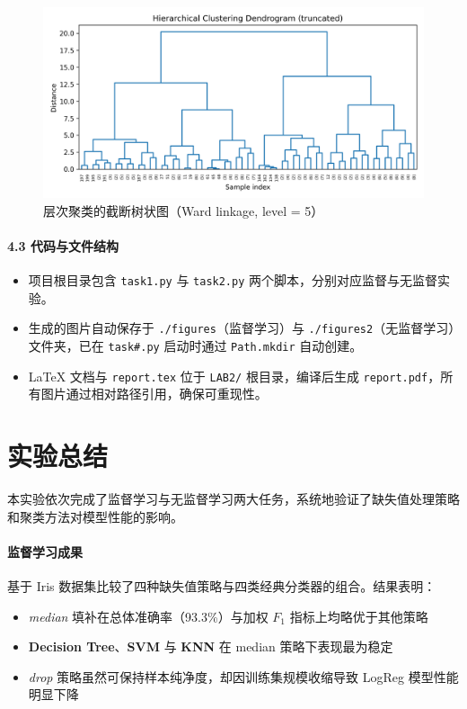 \documentclass[UTF8]{ctexart}
\begin{document}
\begin{figure}[htbp]
    \centering
    \includegraphics[width=\linewidth]{figures2/dendrogram.png}
    \caption{层次聚类的截断树状图（Ward linkage, level = 5）}
    \label{fig:dendro}
\end{figure}

\paragraph{4.3 代码与文件结构}
\begin{itemize}
    \item 项目根目录包含 \texttt{task1.py} 与 \texttt{task2.py} 两个脚本，分别对应监督与无监督实验。
    \item 生成的图片自动保存于
          \texttt{./figures}（监督学习）与
          \texttt{./figures2}（无监督学习）文件夹，已在 \texttt{task\#.py} 启动时通过 \verb|Path.mkdir| 自动创建。
    \item LaTeX 文档与 \texttt{report.tex} 位于 \texttt{LAB2/} 根目录，编译后生成 \texttt{report.pdf}，所有图片通过相对路径引用，确保可重现性。
\end{itemize}



\section*{实验总结}

本实验依次完成了监督学习与无监督学习两大任务，系统地验证了缺失值处理策略和聚类方法对模型性能的影响。

\paragraph{监督学习成果} 
基于 Iris 数据集比较了四种缺失值策略与四类经典分类器的组合。结果表明：
\begin{itemize}
    \item \emph{median} 填补在总体准确率（\num{93.3}\%）与加权 $F_1$ 指标上均略优于其他策略
    \item \textbf{Decision Tree}、\textbf{SVM} 与 \textbf{KNN} 在 median 策略下表现最为稳定
    \item \emph{drop} 策略虽然可保持样本纯净度，却因训练集规模收缩导致 LogReg 模型性能明显下降
\end{itemize}
\end{document}
